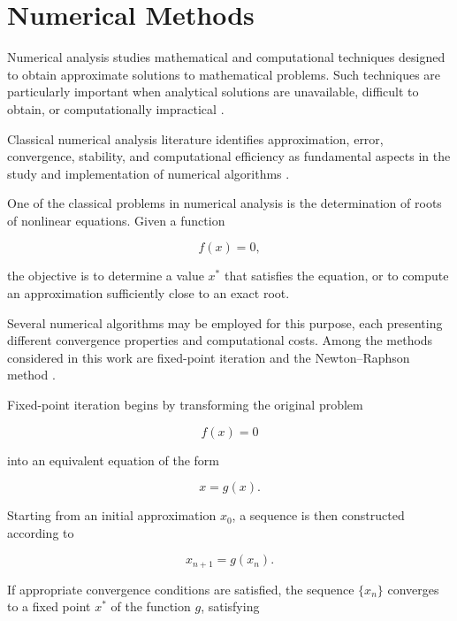 \section{Numerical Methods}

Numerical analysis studies mathematical and computational techniques designed
to obtain approximate solutions to mathematical problems. Such techniques are
particularly important when analytical solutions are unavailable, difficult to
obtain, or computationally impractical
\cite{burden2016numerical,chapra2021numerical}.

Classical numerical analysis literature identifies approximation, error,
convergence, stability, and computational efficiency as fundamental aspects in
the study and implementation of numerical algorithms
\cite{burden2016numerical,higham2002accuracy}.

One of the classical problems in numerical analysis is the determination of
roots of nonlinear equations. Given a function

\begin{equation}
    f(x) = 0,
\end{equation}

the objective is to determine a value $x^\ast$ that satisfies the equation, or
to compute an approximation sufficiently close to an exact root.

Several numerical algorithms may be employed for this purpose, each presenting
different convergence properties and computational costs. Among the methods
considered in this work are fixed-point iteration and the Newton--Raphson
method
\cite{burden2016numerical,chapra2021numerical}.

Fixed-point iteration begins by transforming the original problem

\begin{equation}
    f(x) = 0
\end{equation}

into an equivalent equation of the form

\begin{equation}
    x = g(x).
\end{equation}

Starting from an initial approximation $x_0$, a sequence is then constructed
according to

\begin{equation}
    x_{n+1} = g(x_n).
\end{equation}

If appropriate convergence conditions are satisfied, the sequence $\{x_n\}$
converges to a fixed point $x^\ast$ of the function $g$, satisfying

